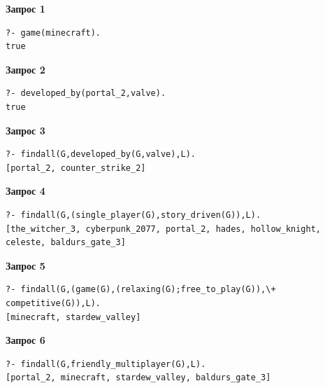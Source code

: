 \noindent\begin{minipage}{\linewidth}
\textbf{Запрос 1}
\begin{lstlisting}
?- game(minecraft).
true
\end{lstlisting}
\end{minipage}\par\smallskip

\noindent\begin{minipage}{\linewidth}
\textbf{Запрос 2}
\begin{lstlisting}
?- developed_by(portal_2,valve).
true
\end{lstlisting}
\end{minipage}\par\smallskip

\noindent\begin{minipage}{\linewidth}
\textbf{Запрос 3}
\begin{lstlisting}
?- findall(G,developed_by(G,valve),L).
[portal_2, counter_strike_2]
\end{lstlisting}
\end{minipage}\par\smallskip

\noindent\begin{minipage}{\linewidth}
\textbf{Запрос 4}
\begin{lstlisting}
?- findall(G,(single_player(G),story_driven(G)),L).
[the_witcher_3, cyberpunk_2077, portal_2, hades, hollow_knight,
celeste, baldurs_gate_3]
\end{lstlisting}
\end{minipage}\par\smallskip

\noindent\begin{minipage}{\linewidth}
\textbf{Запрос 5}
\begin{lstlisting}
?- findall(G,(game(G),(relaxing(G);free_to_play(G)),\+ competitive(G)),L).
[minecraft, stardew_valley]
\end{lstlisting}
\end{minipage}\par\smallskip

\noindent\begin{minipage}{\linewidth}
\textbf{Запрос 6}
\begin{lstlisting}
?- findall(G,friendly_multiplayer(G),L).
[portal_2, minecraft, stardew_valley, baldurs_gate_3]
\end{lstlisting}
\end{minipage}\par\smallskip

